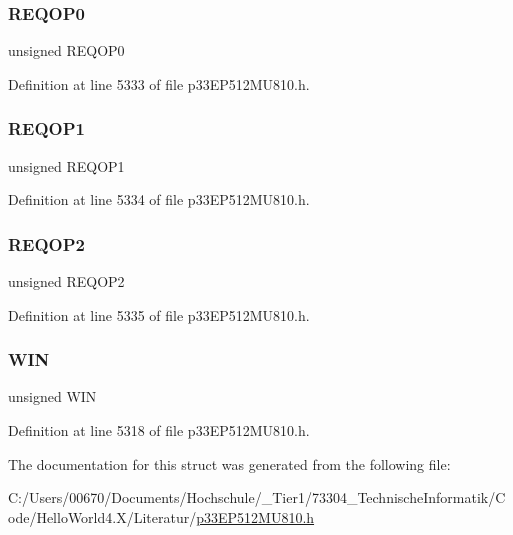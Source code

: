 \subsubsection{\texorpdfstring{R\+E\+Q\+O\+P0}{REQOP0}}
{\footnotesize\ttfamily unsigned R\+E\+Q\+O\+P0}



Definition at line 5333 of file p33\+E\+P512\+M\+U810.\+h.

\mbox{\label{structtag_c2_c_t_r_l1_b_i_t_s_a0f28e42eb67e01b2b0b5e0f80f9b549d}} 
\subsubsection{\texorpdfstring{R\+E\+Q\+O\+P1}{REQOP1}}
{\footnotesize\ttfamily unsigned R\+E\+Q\+O\+P1}



Definition at line 5334 of file p33\+E\+P512\+M\+U810.\+h.

\mbox{\label{structtag_c2_c_t_r_l1_b_i_t_s_adc514515672b885adedefd72b3633293}} 
\subsubsection{\texorpdfstring{R\+E\+Q\+O\+P2}{REQOP2}}
{\footnotesize\ttfamily unsigned R\+E\+Q\+O\+P2}



Definition at line 5335 of file p33\+E\+P512\+M\+U810.\+h.

\mbox{\label{structtag_c2_c_t_r_l1_b_i_t_s_a90ca5ea17e8ea3beddc52942ba75c12d}} 
\subsubsection{\texorpdfstring{W\+IN}{WIN}}
{\footnotesize\ttfamily unsigned W\+IN}



Definition at line 5318 of file p33\+E\+P512\+M\+U810.\+h.



The documentation for this struct was generated from the following file\+:\begin{DoxyCompactItemize}
\item 
C\+:/\+Users/00670/\+Documents/\+Hochschule/\+\_\+\+Tier1/73304\+\_\+\+Technische\+Informatik/\+Code/\+Hello\+World4.\+X/\+Literatur/\hyperlink{p33_e_p512_m_u810_8h}{p33\+E\+P512\+M\+U810.\+h}\end{DoxyCompactItemize}
